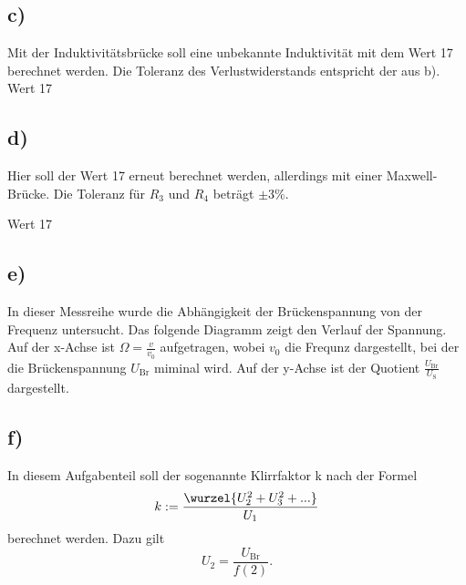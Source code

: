 \subsection{c)}
Mit der Induktivitätsbrücke soll eine unbekannte Induktivität mit dem Wert 17 berechnet werden.
Die Toleranz des Verlustwiderstands entspricht der aus b).
Wert 17


\subsection{d)}
Hier soll der Wert 17 erneut berechnet werden, allerdings mit einer Maxwell-Brücke.
Die Toleranz für $R_3$ und $R_4$ beträgt $\pm 3\%$.

Wert 17

\subsection{e)}
In dieser Messreihe wurde die Abhängigkeit der Brückenspannung von der Frequenz untersucht.
Das folgende Diagramm zeigt den Verlauf der Spannung.
Auf der x-Achse ist $\Omega = \frac{v}{v_0}$ aufgetragen, wobei $v_0$ die Frequnz dargestellt, bei 
der die Brückenspannung $U_\text{Br}$ miminal wird.
Auf der y-Achse ist der Quotient $\frac{U_\text{Br}}{U_\text{S}}$ dargestellt.


\subsection{f)}
In diesem Aufgabenteil soll der sogenannte Klirrfaktor k nach der Formel
\begin{equation}
     k := \frac{\wurzel{U_2^2 + U_3^2 + ...}}{U_1}
\end{equation}
berechnet werden.
Dazu gilt
\begin{equation}
    U_2 = \frac{U_\text{Br}}{f(2)} .
\end{equation}